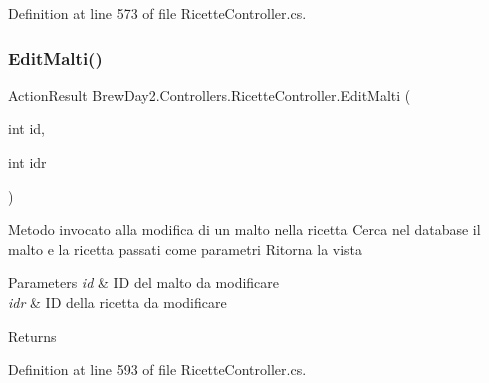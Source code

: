 Definition at line 573 of file Ricette\+Controller.\+cs.

\mbox{\label{class_brew_day2_1_1_controllers_1_1_ricette_controller_aca875a01813208cd08ebf7d5b18115c7}} 
\subsubsection{\texorpdfstring{Edit\+Malti()}{EditMalti()}\hspace{0.1cm}{\footnotesize\ttfamily [1/2]}}
{\footnotesize\ttfamily Action\+Result Brew\+Day2.\+Controllers.\+Ricette\+Controller.\+Edit\+Malti (\begin{DoxyParamCaption}\item[{int}]{id,  }\item[{int}]{idr }\end{DoxyParamCaption})}



Metodo invocato alla modifica di un malto nella ricetta Cerca nel database il malto e la ricetta passati come parametri Ritorna la vista 


\begin{DoxyParams}{Parameters}
{\em id} & ID del malto da modificare\\
\hline
{\em idr} & ID della ricetta da modificare\\
\hline
\end{DoxyParams}
\begin{DoxyReturn}{Returns}

\end{DoxyReturn}


Definition at line 593 of file Ricette\+Controller.\+cs.

\mbox{\label{class_brew_day2_1_1_controllers_1_1_ricette_controller_a38cdcb5cefa1ee88dc5206abad03b56f}} 
